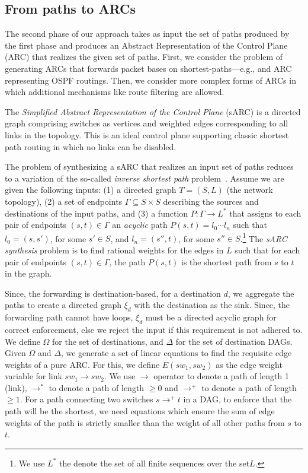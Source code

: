 

\subsection{From paths to ARCs}

The second phase of our approach takes as input the set of paths produced by the first phase
and produces an Abstract Representation of the Control Plane (ARC) that realizes the given set of paths.
First, we  consider the problem of generating ARCs that
 forwards packet bases on shortest-paths---e.g., and ARC representing OSPF routings.
Then, we consider more complex forms of ARCs in which 
 additional mechanisms like route filtering are allowed. 
 
The \emph{Simplified Abstract Representation of the Control Plane} (sARC) is a directed graph comprising switches as 
vertices and weighted edges corresponding to all links in the
topology. 
This is an ideal control plane supporting classic shortest path routing in which no links can be disabled. 

The problem of synthesizing 
a sARC that realizes an input set of paths reduces to a
variation of the so-called {\em inverse shortest path} problem~\cite{}. 
Assume we are given the following inputs: (1) a directed graph $T = (S, L)$ (the network topology), 
(2) a set of endpoints $\Gamma \subseteq S\times S$
describing the sources and destinations of the input paths, and 
(3) a function $P: \Gamma \rightarrow L^*$
that assigns to each pair of endpoints $(s,t) \in \Gamma$ 
an \emph{acyclic} path $P(s,t)=l_0\cdots l_n$ such
that $l_0=(s,s')$, for some $s'\in S$, and $l_n=(s'',t)$, for some $s''\in S$.\footnote{
We use $L^*$ the denote the set of all finite sequences over the set$L$.}
The 
\emph{sARC synthesis}
problem is to find rational weights for the edges in $L$ such that 
for each pair of endpoints $(s,t) \in \Gamma$, 
the path $P(s,t)$ is the shortest path from $s$ to $t$ 
in the graph. 

Since, the forwarding is destination-based,
for a destination $d$, we aggregate the paths 
to create a directed graph $\xi_d$ with the destination
as the sink. Since, the forwarding path cannot have 
loops, $\xi_d$ must be a directed acyclic graph for 
correct enforcement, else we reject the input if this
requirement is not adhered to.
We define $\Omega$ for the 
set of destinations, and $\Delta$ for  
the set of destination DAGs. 
Given $\Omega$ and $\Delta$, we generate a set of linear equations
to find the requisite edge weights of a pure ARC. 
For this, we define $E(sw_1, sw_2)$ as
the edge weight variable for link $sw_1 \rightarrow sw_2$. 
We use $\rightarrow$ operator to denote a path of length 1 
(link), $\rightarrow^*$ to denote a path of length $\geq 0$
and $\rightarrow^+$ to denote a path of length $\geq 1$.
For a path connecting two switches 
$s \rightarrow^+ t$ in a DAG, 
to enforce that the path will be the shortest, we need equations
which ensure the sum of edge weights of the path is strictly smaller than
the weight of all other paths from $s$ to $t$. 

